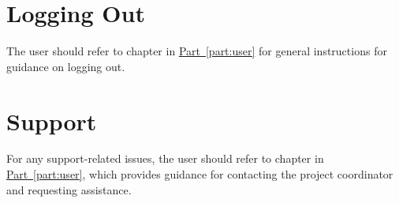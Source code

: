 


\chapter{Logging Out} \label{chap:admin-logout}

The \admin user should refer to chapter \hyperref[chap:user-logout]{} in \hyperref[part:user]{Part~\ref*{part:user}} for general instructions for guidance on logging out.
 


\chapter{Support} \label{chap:admin-support}

For any support-related issues, the \admin user should refer to chapter \hyperref[chap:user-support]{} in \hyperref[part:user]{Part~\ref*{part:user}}, which provides guidance for contacting the project coordinator and requesting assistance.

